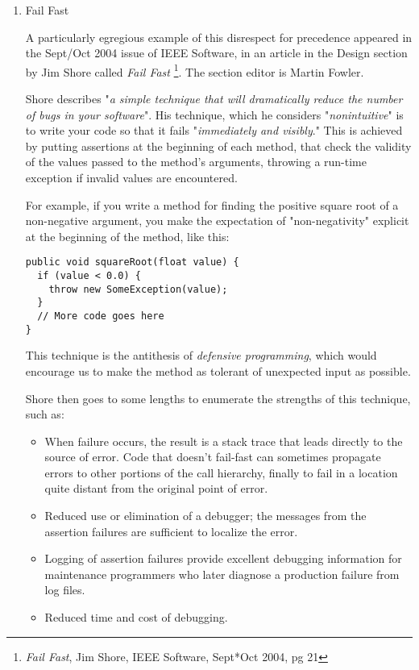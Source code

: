 \documentclass{article}
\begin{document}
\begin{enumerate}
\item Fail Fast
\label{sec:orgheadline411}

A particularly egregious example of this disrespect for precedence
appeared in the Sept/Oct 2004 issue of IEEE Software, in an article in
the Design section by Jim Shore called \emph{Fail Fast} \footnote{\emph{Fail Fast}, Jim Shore, IEEE Software, Sept*Oct 2004, pg 21}. The section
editor is Martin Fowler.

Shore describes "\emph{a simple technique that will dramatically reduce the
number of bugs in your software}". His technique, which he considers
"\emph{nonintuitive}" is to write your code so that it fails "\emph{immediately
and visibly}." This is achieved by putting assertions at the beginning
of each method, that check the validity of the values passed to the
method's arguments, throwing a run-time exception if invalid values are
encountered.

For example, if you write a method for finding the positive square root
of a non-negative argument, you make the expectation of "non-negativity"
explicit at the beginning of the method, like this:

\begin{verbatim}
public void squareRoot(float value) {
  if (value < 0.0) {
    throw new SomeException(value);
  }
  // More code goes here
}
\end{verbatim}

This technique is the antithesis of \emph{defensive programming}, which would
encourage us to make the method as tolerant of unexpected input as
possible.

Shore then goes to some lengths to enumerate the strengths of this
technique, such as:

\begin{itemize}
\item When failure occurs, the result is a stack trace that leads directly
to the source of error. Code that doesn't fail-fast can sometimes
propagate errors to other portions of the call hierarchy, finally to
fail in a location quite distant from the original point of error.\\
\item Reduced use or elimination of a debugger; the messages from the
assertion failures are sufficient to localize the error.\\
\item Logging of assertion failures provide excellent debugging information
for maintenance programmers who later diagnose a production failure
from log files.\\
\item Reduced time and cost of debugging.
\end{itemize}


\end{enumerate}
\end{document}
